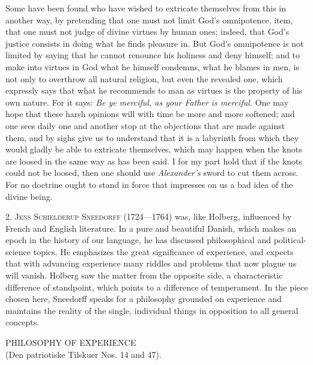 \documentclass[12pt,a4paper,openany]{book}
\newcommand{\opage}[1]{\marginnote{\footnotesize\textit{[#1]}}}
\newcommand{\excerpthead}[1]{\par\bigskip\begin{center}#1\end{center}\nopagebreak\smallskip}
\newenvironment{intro}{\par}{\par}
\begin{document}
Some have been found who have wished to extricate themselves from this in another
way, by pretending that one must not limit God's omnipotence, item, that
one must not judge of divine virtues by human ones; indeed, that God's justice
consists in doing what he finds pleasure in. But God's omnipotence is not limited
by saying that he cannot renounce his holiness and deny himself; and to
make into virtues in God what he himself condemns, what he blames in men, is not
only to overthrow all natural religion, but even the revealed one, which expressly
says that what he recommends to man as virtues is the property of his
own nature. For it says: \emph{Be ye merciful, as your Father}
\emph{is merciful.} One may hope that these harsh opinions will with time be more
and more softened; and one sees daily one and another stop at the
objections that are made against them, and by sighs give us to
understand that it is a labyrinth from which they would gladly be able to extricate
themselves, which may happen when the knots are loosed in the same way as has been
said. I for my part hold that if the knots could not be loosed, then one should
use \textit{Alexander's} sword to cut them across. For no doctrine ought to stand
in force that impresses on us a bad idea of the divine being.

\begin{intro}

\setcounter{footnote}{0}%
\opage{29}2. \textsc{Jens Schielderup Sneedorff} (1724---1764) was, like Holberg,
influenced by French and English literature. In a pure and beautiful Danish, which
makes an epoch in the history of our language, he has discussed philosophical and
political-science topics. He emphasizes the great significance of experience, and
expects that with advancing experience many riddles and problems that now plague
us will vanish. Holberg saw the matter from the opposite side, a characteristic
difference of standpoint, which points to a difference of temperament. In the piece
chosen here, Sneedorff speaks for a philosophy grounded on experience and maintains
the reality of the single, individual things in opposition to all general
concepts.
\end{intro}

\excerpthead{PHILOSOPHY OF EXPERIENCE \\ (Den patriotiske Tilskuer Nos. 14 and 47).}
\end{document}
